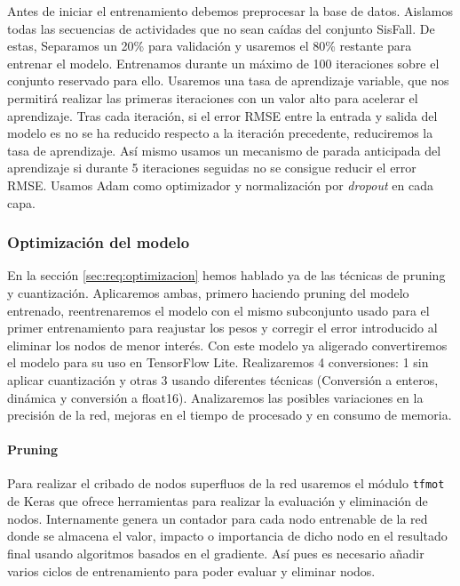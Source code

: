 Antes de iniciar el entrenamiento debemos preprocesar la base de datos. Aislamos todas las secuencias de actividades que no sean caídas del conjunto SisFall. De estas, Separamos un 20\% para validación y usaremos el 80\% restante para entrenar el modelo. Entrenamos durante un máximo de 100 iteraciones sobre el conjunto reservado para ello. Usaremos una tasa de aprendizaje variable, que nos permitirá realizar las primeras iteraciones con un valor alto para acelerar el aprendizaje. Tras cada iteración, si el error RMSE entre la entrada y salida del modelo es no se ha reducido respecto a la iteración precedente, reduciremos la tasa de aprendizaje. Así mismo usamos un mecanismo de parada anticipada del aprendizaje si durante 5 iteraciones seguidas no se consigue reducir el error RMSE. Usamos Adam como optimizador y normalización por \textit{dropout} en cada capa. 



\subsubsection{Optimización del modelo}

En la sección \ref{sec:req:optimizacion} hemos hablado ya de las técnicas de pruning y cuantización. Aplicaremos ambas, primero haciendo pruning del modelo entrenado, reentrenaremos el modelo con el mismo subconjunto usado para el primer entrenamiento para reajustar los pesos y corregir el error introducido al eliminar los nodos de menor interés. Con este modelo ya aligerado convertiremos el modelo para su uso en TensorFlow Lite. Realizaremos 4 conversiones: 1 sin aplicar cuantización y otras 3 usando diferentes técnicas (Conversión a enteros, dinámica y conversión a float16). Analizaremos las posibles variaciones en la precisión de la red, mejoras en el tiempo de procesado y en consumo de memoria.

\paragraph{Pruning}
Para realizar el cribado de nodos superfluos de la red usaremos el módulo \texttt{tfmot} de Keras que ofrece herramientas para realizar la evaluación y eliminación de nodos. Internamente genera un contador para cada nodo entrenable de la red donde se almacena el valor, impacto o importancia de dicho nodo en el resultado final usando algoritmos basados en el gradiente. Así pues es necesario añadir varios ciclos de entrenamiento para poder evaluar y eliminar nodos.


